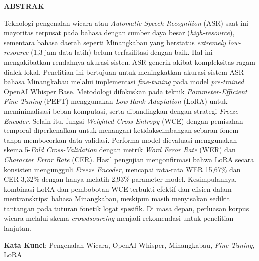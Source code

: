 \clearpage
{}%
\thispagestyle{fancy}

\begin{center}
	\large \bfseries \MakeUppercase{Abstrak}\\
	\bigskip
	
	\normalsize \normalfont \justifying \singlespacing
	Teknologi pengenalan wicara atau \textit{Automatic Speech Recognition} (ASR) saat ini mayoritas terpusat pada bahasa dengan sumber daya besar (\textit{high-resource}), sementara bahasa daerah seperti Minangkabau yang berstatus \textit{extremely low-resource} (1,3 jam data latih) belum terfasilitasi dengan baik. Hal ini mengakibatkan rendahnya akurasi sistem ASR generik akibat kompleksitas ragam dialek lokal. Penelitian ini bertujuan untuk meningkatkan akurasi sistem ASR bahasa Minangkabau melalui implementasi \textit{fine-tuning} pada model \textit{pre-trained} OpenAI Whisper Base. Metodologi difokuskan pada teknik \textit{Parameter-Efficient Fine-Tuning} (PEFT) menggunakan \textit{Low-Rank Adaptation} (LoRA) untuk meminimalisasi beban komputasi, serta dibandingkan dengan strategi \textit{Freeze Encoder}. Selain itu, fungsi \textit{Weighted Cross-Entropy} (WCE) dengan pemisahan temporal diperkenalkan untuk menangani ketidakseimbangan sebaran fonem tanpa membocorkan data validasi. Performa model dievaluasi menggunakan skema 5-\textit{Fold Cross-Validation} dengan metrik \textit{Word Error Rate} (WER) dan \textit{Character Error Rate} (CER). Hasil pengujian mengonfirmasi bahwa LoRA secara konsisten mengungguli \textit{Freeze Encoder}, mencapai rata-rata WER 15,67\% dan CER 3,32\% dengan hanya melatih 2,93\% parameter model. Kesimpulannya, kombinasi LoRA dan pembobotan WCE terbukti efektif dan efisien dalam mentranskripsi bahasa Minangkabau, meskipun masih menyisakan sedikit tantangan pada tuturan fonetik logat spesifik. Di masa depan, perluasan korpus wicara melalui skema \textit{crowdsourcing} menjadi rekomendasi untuk penelitian lanjutan.\par

    \vspace{20pt}
	\raggedright \textbf{Kata Kunci}: Pengenalan Wicara, OpenAI Whisper, Minangkabau, \textit{Fine-Tuning}, LoRA
    
	\vfill
	
\end{center}
\clearpage
